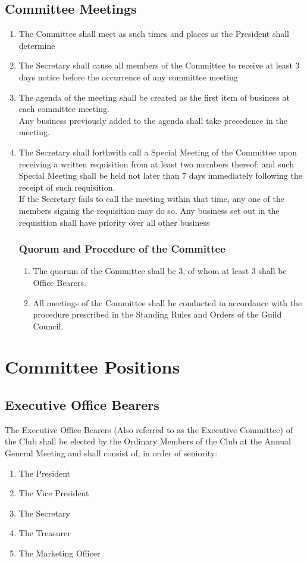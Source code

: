 \documentclass[10pt,a4paper]{report}
\begin{document}
	\section{Committee Meetings}
	\begin{enumerate}[label=\alph*]
		\item The Committee shall meet as such times and places as the President shall determine
		\item The Secretary shall cause all members of the Committee to receive at least 3 days notice before the occurrence of any committee meeting
		\item The agenda of the meeting shall be created as the first item of business at each committee meeting. \\
		Any business previously added to the agenda shall take precedence in the meeting.
		\item The Secretary shall forthwith call a Special Meeting of the Committee upon receiving a written requisition from at least two members thereof; and such Special Meeting shall be held not later than 7 days immediately following the receipt of such requisition. \\
		If the Secretary fails to call the meeting within that time, any one of the members signing the requisition may do so. Any business set out in the requisition shall have priority over all other business
		\subsection{Quorum and Procedure of the Committee}
		\begin{enumerate}[label=\alph*]
		\item The quorum of the Committee shall be 3, of whom at least 3 shall be Office Bearers.
		\item All meetings of the Committee shall be conducted in accordance with the procedure prescribed in the Standing Rules and Orders of the Guild Council.
		\end{enumerate}
	\end{enumerate}

	\chapter{Committee Positions}
	\section{Executive Office Bearers}
	The Executive Office Bearers (Also referred to as the Executive Committee) of the Club shall be elected by the Ordinary Members of the Club at the Annual General Meeting and shall consist of, in order of seniority:
		\begin{enumerate}[label=\alph*]	
			\item The President
			\item The Vice President
			\item The Secretary
			\item The Treasurer
			\item The Marketing Officer
		\end{enumerate}
\end{document}
